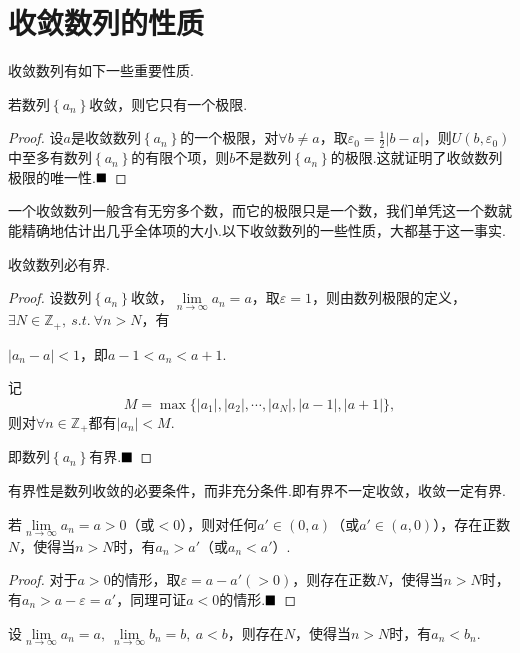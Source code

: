 \section{收敛数列的性质}
收敛数列有如下一些重要性质.
\begin{theorem}[唯一性]
	若数列$\left\{a_n\right\}$收敛，则它只有一个极限.
\end{theorem}
\begin{proof}
	设$a$是收敛数列$\left\{a_n\right\}$的一个极限，对$\forall b\neq a$，取$\varepsilon_0=\frac{1}{2}|b-a|$，则$U(b,\varepsilon_0)$中至多有数列$\left\{a_n\right\}$的有限个项，则$b$不是数列$\left\{a_n\right\}$的极限.这就证明了收敛数列极限的唯一性.$\hfill\blacksquare$
\end{proof}
一个收敛数列一般含有无穷多个数，而它的极限只是一个数，我们单凭这一个数就能精确地估计出几乎全体项的大小.以下收敛数列的一些性质，大都基于这一事实.
\begin{theorem}[有界性]
	收敛数列必有界.
\end{theorem}
\begin{proof}
	设数列$\left\{a_n\right\}$收敛，$\lim\limits_{n\to\infty}a_n=a$，取$\varepsilon=1$，则由数列极限的定义，$\exists N\in\mathbb{Z}_+,\ s.t.\ \forall n>N$，有
	
	\begin{center}
		$\lvert a_n-a\rvert<1$，即$a-1<a_n<a+1$.
	\end{center}
	
	记$$M=\max\{|a_1|,|a_2|,\cdots,|a_N|,|a-1|,|a+1|\},$$
	则对$\forall n\in\mathbb{Z}_+$都有$|a_n|<M$.
	
	即数列$\left\{a_n\right\}$有界.$\hfill\blacksquare$
\end{proof}
\begin{remark}
	有界性是数列收敛的必要条件，而非充分条件.即有界不一定收敛，收敛一定有界.
\end{remark}
\begin{theorem}[保号性]
	若$\lim\limits_{n\to\infty}a_n=a>0$（或$<0$），则对任何$a'\in(0,a)$（或$a'\in (a,0)$），存在正数$N$，使得当$n>N$时，有$a_n>a'$（或$a_n<a'$）.
\end{theorem}
\begin{proof}
	对于$a>0$的情形，取$\varepsilon=a-a'(>0)$，则存在正数$N$，使得当$n>N$时，有$a_n>a-\varepsilon=a'$，同理可证$a<0$的情形.$\hfill\blacksquare$
\end{proof}
\begin{corollary}[保号性推论]
	设$\lim\limits_{n\to\infty}a_n=a,\ \lim\limits_{n\to\infty}b_n=b,\ a<b$，则存在$N$，使得当$n>N$时，有$a_n<b_n.$
\end{corollary}
